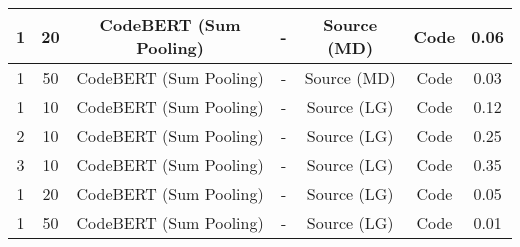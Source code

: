 \begin{longtable}{|c|c|c|c|c|c|c|}
\hline
1 & 20 & CodeBERT (Sum Pooling) & - & Source (MD) & Code & 0.06 \\
\hline
1 & 50 & CodeBERT (Sum Pooling) & - & Source (MD) & Code & 0.03 \\
\hline
1 & 10 & CodeBERT (Sum Pooling) & - & Source (LG) & Code & 0.12 \\
\hline
2 & 10 & CodeBERT (Sum Pooling) & - & Source (LG) & Code & 0.25 \\
\hline
3 & 10 & CodeBERT (Sum Pooling) & - & Source (LG) & Code & 0.35 \\
\hline
1 & 20 & CodeBERT (Sum Pooling) & - & Source (LG) & Code & 0.05 \\
\hline
1 & 50 & CodeBERT (Sum Pooling) & - & Source (LG) & Code & 0.01 \\
\hline
\end{longtable}
